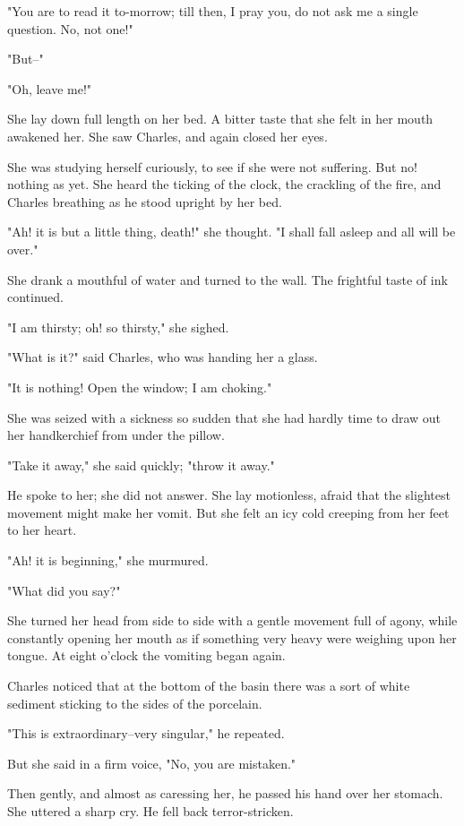 \documentclass{tufte-book}
\begin{document}
"You are to read it to-morrow; till then, I pray you, do not ask me a
single question. No, not one!"

"But--"

"Oh, leave me!"

She lay down full length on her bed. A bitter taste that she felt in her
mouth awakened her. She saw Charles, and again closed her eyes.

She was studying herself curiously, to see if she were not suffering.
But no! nothing as yet. She heard the ticking of the clock, the
crackling of the fire, and Charles breathing as he stood upright by her
bed.

"Ah! it is but a little thing, death!" she thought. "I shall fall asleep
and all will be over."

She drank a mouthful of water and turned to the wall. The frightful
taste of ink continued.

"I am thirsty; oh! so thirsty," she sighed.

"What is it?" said Charles, who was handing her a glass.

"It is nothing! Open the window; I am choking."

She was seized with a sickness so sudden that she had hardly time to
draw out her handkerchief from under the pillow.

"Take it away," she said quickly; "throw it away."

He spoke to her; she did not answer. She lay motionless, afraid that
the slightest movement might make her vomit. But she felt an icy cold
creeping from her feet to her heart.

"Ah! it is beginning," she murmured.

"What did you say?"

She turned her head from side to side with a gentle movement full of
agony, while constantly opening her mouth as if something very heavy
were weighing upon her tongue. At eight o'clock the vomiting began
again.

Charles noticed that at the bottom of the basin there was a sort of
white sediment sticking to the sides of the porcelain.

"This is extraordinary--very singular," he repeated.

But she said in a firm voice, "No, you are mistaken."

Then gently, and almost as caressing her, he passed his hand over her
stomach. She uttered a sharp cry. He fell back terror-stricken.
\end{document}
